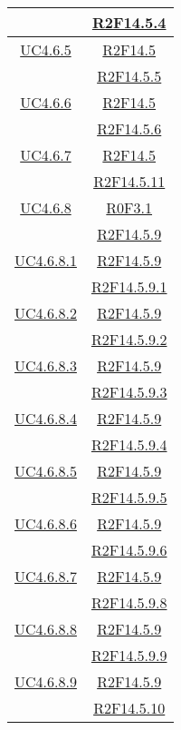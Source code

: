 \begin{longtable}{|c|c|}
& \hyperlink{R2F14.5.4}{R2F14.5.4}\\
\hline
\hyperlink{UC4.6.5}{UC4.6.5} & \hyperlink{R2F14.5}{R2F14.5}\\
& \hyperlink{R2F14.5.5}{R2F14.5.5}\\
\hline
\hyperlink{UC4.6.6}{UC4.6.6} & \hyperlink{R2F14.5}{R2F14.5}\\
& \hyperlink{R2F14.5.6}{R2F14.5.6}\\
\hline
\hyperlink{UC4.6.7}{UC4.6.7} & \hyperlink{R2F14.5}{R2F14.5}\\
& \hyperlink{R2F14.5.11}{R2F14.5.11}\\
\hline
\hyperlink{UC4.6.8}{UC4.6.8} & \hyperlink{R0F3.1}{R0F3.1}\\
& \hyperlink{R2F14.5.9}{R2F14.5.9}\\
\hline
\hyperlink{UC4.6.8.1}{UC4.6.8.1} & \hyperlink{R2F14.5.9}{R2F14.5.9}\\
& \hyperlink{R2F14.5.9.1}{R2F14.5.9.1}\\
\hline
\hyperlink{UC4.6.8.2}{UC4.6.8.2} & \hyperlink{R2F14.5.9}{R2F14.5.9}\\
& \hyperlink{R2F14.5.9.2}{R2F14.5.9.2}\\
\hline
\hyperlink{UC4.6.8.3}{UC4.6.8.3} & \hyperlink{R2F14.5.9}{R2F14.5.9}\\
& \hyperlink{R2F14.5.9.3}{R2F14.5.9.3}\\
\hline
\hyperlink{UC4.6.8.4}{UC4.6.8.4} & \hyperlink{R2F14.5.9}{R2F14.5.9}\\
& \hyperlink{R2F14.5.9.4}{R2F14.5.9.4}\\
\hline
\hyperlink{UC4.6.8.5}{UC4.6.8.5} & \hyperlink{R2F14.5.9}{R2F14.5.9}\\
& \hyperlink{R2F14.5.9.5}{R2F14.5.9.5}\\
\hline
\hyperlink{UC4.6.8.6}{UC4.6.8.6} & \hyperlink{R2F14.5.9}{R2F14.5.9}\\
& \hyperlink{R2F14.5.9.6}{R2F14.5.9.6}\\
\hline
\hyperlink{UC4.6.8.7}{UC4.6.8.7} & \hyperlink{R2F14.5.9}{R2F14.5.9}\\
& \hyperlink{R2F14.5.9.8}{R2F14.5.9.8}\\
\hline
\hyperlink{UC4.6.8.8}{UC4.6.8.8} & \hyperlink{R2F14.5.9}{R2F14.5.9}\\
& \hyperlink{R2F14.5.9.9}{R2F14.5.9.9}\\
\hline
\hyperlink{UC4.6.8.9}{UC4.6.8.9} & \hyperlink{R2F14.5.9}{R2F14.5.9}\\
& \hyperlink{R2F14.5.10}{R2F14.5.10}\\

\end{longtable}
